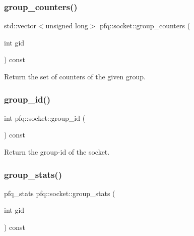 \mbox{\label{classpfq_1_1socket_ac1548d51e8727a57fe6e98953769bf80}} 
\subsubsection{\texorpdfstring{group\+\_\+counters()}{group\_counters()}}
{\footnotesize\ttfamily std\+::vector$<$unsigned long$>$ pfq\+::socket\+::group\+\_\+counters (\begin{DoxyParamCaption}\item[{int}]{gid }\end{DoxyParamCaption}) const\hspace{0.3cm}{\ttfamily [inline]}}



Return the set of counters of the given group. 

\mbox{\label{classpfq_1_1socket_a469d06a58cfbe1a24893ce619218d536}} 
\subsubsection{\texorpdfstring{group\+\_\+id()}{group\_id()}}
{\footnotesize\ttfamily int pfq\+::socket\+::group\+\_\+id (\begin{DoxyParamCaption}{ }\end{DoxyParamCaption}) const\hspace{0.3cm}{\ttfamily [inline]}}



Return the group-\/id of the socket. 

\mbox{\label{classpfq_1_1socket_aba2cd658b52f9c00b163deb891983709}} 
\subsubsection{\texorpdfstring{group\+\_\+stats()}{group\_stats()}}
{\footnotesize\ttfamily pfq\+\_\+stats pfq\+::socket\+::group\+\_\+stats (\begin{DoxyParamCaption}\item[{int}]{gid }\end{DoxyParamCaption}) const\hspace{0.3cm}{\ttfamily [inline]}}



